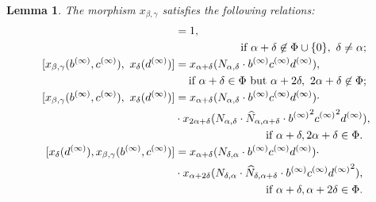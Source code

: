 \documentclass{article}
\numberwithin{equation}{section}
\newtheorem{lemma}{Lemma} \numberwithin{lemma}{section}
\theoremstyle{definition}
\theoremstyle{remark}
\begin{document}
\begin{lemma} \label{lem:elim-lhs}
 The morphism $x_{\beta, \gamma}$ satisfies the following relations:
 \begin{align}  
  [x_{\beta, \gamma}(b^{(\infty)}, c^{(\infty)}),\ x_\delta(d^{(\infty)})] &= 1, \label{R2-bg}\\ 
 \multispan2{\hfil if $\alpha + \delta \not\in\Phi \cup \{0\},\ \delta\neq\alpha;$} \nonumber \\
 [x_{\beta, \gamma}(b^{(\infty)}, c^{(\infty)}),\ x_\delta(d^{(\infty)})] &= x_{\alpha + \delta}(N_{\alpha,\delta} \cdot b^{(\infty)}c^{(\infty)}d^{(\infty)}), \label{R3-bg} \\
 \multispan2{\hfill if $\alpha+\delta\in\Phi$ but $\alpha+2\delta,\ 2\alpha+\delta\not\in\Phi;$} \nonumber \\
 [x_{\beta, \gamma}(b^{(\infty)}, c^{(\infty)}),\ x_\delta(d^{(\infty)})] &= x_{\alpha + \delta}(N_{\alpha,\delta} \cdot b^{(\infty)}c^{(\infty)}d^{(\infty)}) \cdot \label{R4-bg1} \\ & \cdot x_{2\alpha+\delta}(N_{\alpha,\delta} \cdot \widehat{N}_{\alpha, \alpha+\delta}\cdot {b^{(\infty)}}^2{c^{(\infty)}}^2d^{(\infty)}), \nonumber \\ \multispan2{ \hfill if $\alpha+\delta,2\alpha+\delta\in\Phi.$ \nonumber} \\
 [x_\delta(d^{(\infty)}), x_{\beta, \gamma}(b^{(\infty)}, c^{(\infty)})] &= x_{\alpha + \delta}(N_{\delta, \alpha} \cdot b^{(\infty)}c^{(\infty)}d^{(\infty)}) \cdot \label{R4-bg2} \\ & \cdot x_{\alpha+2\delta}(N_{\delta, \alpha} \cdot \widehat{N}_{\delta, \alpha+\delta}\cdot {b^{(\infty)}}{c^{(\infty)}}{d^{(\infty)}}^2), \nonumber \\ \multispan2{ \hfill if $\alpha+\delta,\alpha+2\delta\in\Phi.$ \nonumber} \end{align}
\end{lemma}
\end{document}
